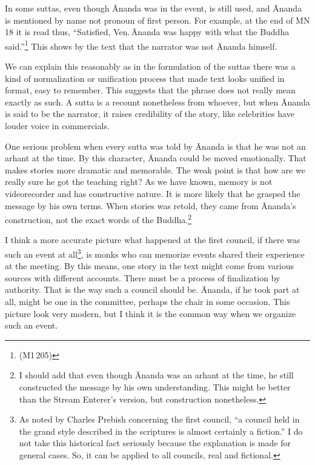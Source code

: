 In some suttas, even though \=Ananda was in the event,  is still used, and \=Ananda is mentioned by name not pronoun of first person. For example, at the end of MN 18 it is read thus, ``Satisfied, Ven.\,\=Ananda was happy with what the Buddha said.''\footnote{ (M1\,205)} This shows by the text that the narrator was not \=Ananda himself.

We can explain this reasonably as in the formulation of the suttas there was a kind of normalization or unification process that made text looks unified in format, easy to remember. This suggests that the phrase  does not really mean exactly as such. A sutta is a recount nonetheless from whoever, but when \=Ananda is said to be the narrator, it raises credibility of the story, like celebrities have louder voice in commercials.

One serious problem when every sutta was told by \=Ananda is that he was not an arhant at the time. By this character, \=Ananda could be moved emotionally. That makes stories more dramatic and memorable. The weak point is that how are we really sure he got the teaching right? As we have known, memory is not videorecorder and has constructive nature. It is more likely that he grasped the message by his own terms. When stories was retold, they came from \=Ananda's construction, not the exact words of the Buddha.\footnote{I should add that even though \=Ananda was an arhant at the time, he still constructed the message by his own understanding. This might be better than the Stream Enterer's version, but construction nonetheless.}

I think a more accurate picture what happened at the first council, if there was such an event at all\footnote{As noted by Charles Prebish concerning the first council, ``a council held in the grand style described in the scriptures is almost certainly a fiction.'' \citep[p.~188]{prebish:councils} I do not take this historical fact seriously because the explanation is made for general cases. So, it can be applied to all councils, real and fictional.}, is monks who can memorize events shared their experience at the meeting. By this means, one story in the text might come from various sources with different accounts. There must be a process of finalization by authority. That is the way such a council should be. \=Ananda, if he took part at all, might be one in the committee, perhaps the chair in some occasion. This picture look very modern, but I think it is the common way when we organize such an event.

